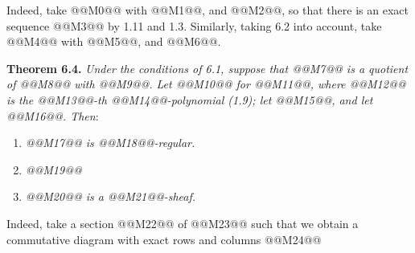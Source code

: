 Indeed, take @@M0@@ with @@M1@@, and @@M2@@, so that there is an exact sequence
@@M3@@
by 1.11 and 1.3. Similarly, taking 6.2 into account, take @@M4@@ with @@M5@@, and @@M6@@.

\textbf{Theorem 6.4.} \emph{Under the conditions of 6.1, suppose that @@M7@@ is a quotient of @@M8@@ with @@M9@@. Let @@M10@@ for @@M11@@, where @@M12@@ is the @@M13@@-th @@M14@@-polynomial (1.9); let @@M15@@, and let @@M16@@. Then}:
\begin{enumerate}[label=(\roman*)]
\item \emph{@@M17@@ is @@M18@@-regular.}
\item \emph{@@M19@@}
\item \emph{@@M20@@ is a @@M21@@-sheaf.}
\end{enumerate}

Indeed, take a section @@M22@@ of @@M23@@ such that we obtain a commutative diagram with exact rows and columns
@@M24@@
